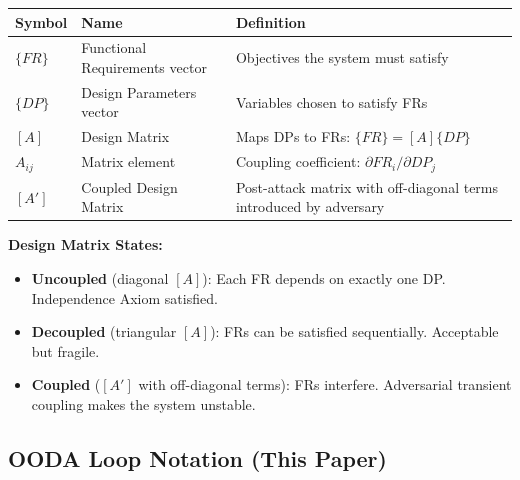 \documentclass[
]{article}
\newcounter{none} %
\providecommand{\tightlist}{%
  \setlength{\itemsep}{0pt}\setlength{\parskip}{0pt}}
\begin{document}
{\def\LTcaptype{none} %
\begin{longtable}[]{@{}
  >{\raggedright\arraybackslash}p{}
  >{\raggedright\arraybackslash}p{}
  >{\raggedright\arraybackslash}p{}@{}}
\toprule\noalign{}
\begin{minipage}[b]{\linewidth}\raggedright
Symbol
\end{minipage} & \begin{minipage}[b]{\linewidth}\raggedright
Name
\end{minipage} & \begin{minipage}[b]{\linewidth}\raggedright
Definition
\end{minipage} \\
\midrule\noalign{}
\endhead
\bottomrule\noalign{}
\endlastfoot
\(\{FR\}\) & Functional Requirements vector & Objectives the system must
satisfy \\
\(\{DP\}\) & Design Parameters vector & Variables chosen to satisfy
FRs \\
\([A]\) & Design Matrix & Maps DPs to FRs: \(\{FR\} = [A]\{DP\}\) \\
\(A_{ij}\) & Matrix element & Coupling coefficient:
\(\partial FR_i / \partial DP_j\) \\
\([A']\) & Coupled Design Matrix & Post-attack matrix with off-diagonal
terms introduced by adversary \\
\end{longtable}
}

\textbf{Design Matrix States:}

\begin{itemize}
\tightlist
\item
  \textbf{Uncoupled} (diagonal \([A]\)): Each FR depends on exactly one
  DP. Independence Axiom satisfied.
\item
  \textbf{Decoupled} (triangular \([A]\)): FRs can be satisfied
  sequentially. Acceptable but fragile.
\item
  \textbf{Coupled} (\([A']\) with off-diagonal terms): FRs interfere.
  Adversarial transient coupling makes the system unstable.
\end{itemize}

\subsection{OODA Loop Notation (This
Paper)}\label{ooda-loop-notation-this-paper}
\end{document}
